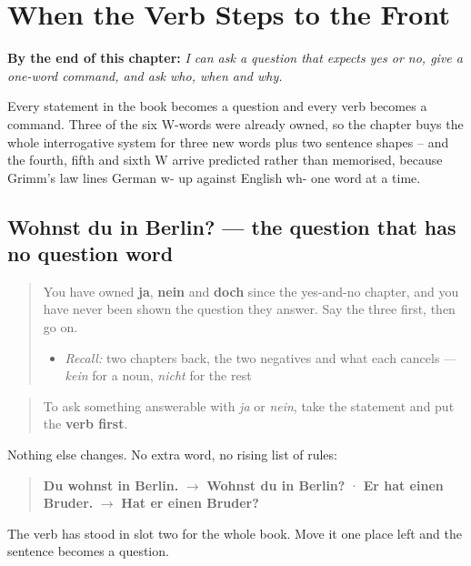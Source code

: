 
\chapter{When the Verb Steps to the Front}
\label{ch:ge-frage}

\begin{chapteropening}
\textbf{By the end of this chapter:} \emph{I can ask a question that expects yes or no, give a one-word command, and ask who, when and why.}

Every statement in the book becomes a question and every verb becomes a command. Three of the six W-words were already owned, so the chapter buys the whole interrogative system for three new words plus two sentence shapes -- and the fourth, fifth and sixth W arrive predicted rather than memorised, because Grimm's law lines German w- up against English wh- one word at a time.
\end{chapteropening}

\section[Wohnst du in Berlin?]{Wohnst du in Berlin? — the question that has no question word}

\label{lesson:GE-C33-ja-nein-frage}



\begin{quote}
You have owned \textbf{ja}, \textbf{nein} and \textbf{doch} since the yes-and-no chapter, and you have never been shown the question they answer. Say the three first, then go on.

\begin{itemize}
\raggedright
  \item \emph{Recall:} two chapters back, the two negatives and what each cancels — \emph{kein} for a noun, \emph{nicht} for the rest
\end{itemize}
\end{quote}

\begin{grammarlens}[title={Grammar Lens: the verb moves to the front}]
\begin{quote}
To ask something answerable with \emph{ja} or \emph{nein}, take the statement and put the \textbf{verb first}.
\end{quote}

Nothing else changes. No extra word, no rising list of rules:

\begin{quote}
\textbf{Du wohnst in Berlin.} $\to$ \textbf{Wohnst du in Berlin?} · \textbf{Er hat einen Bruder.} $\to$ \textbf{Hat er einen Bruder?}
\end{quote}

The verb has stood in slot two for the whole book. Move it one place left and the sentence becomes a question.
\end{grammarlens}

